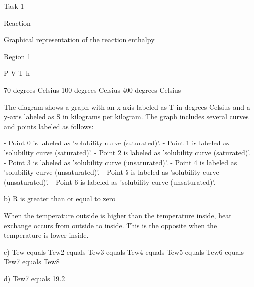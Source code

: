 Task 1

Reaction

Graphical representation of the reaction enthalpy

Region 1

P V T h

70 degrees Celsius 100 degrees Celsius 400 degrees Celsius

The diagram shows a graph with an x-axis labeled as T in degrees Celsius and a y-axis labeled as S in kilograms per kilogram. The graph includes several curves and points labeled as follows:

- Point 0 is labeled as 'solubility curve (saturated)'.
- Point 1 is labeled as 'solubility curve (saturated)'.
- Point 2 is labeled as 'solubility curve (saturated)'.
- Point 3 is labeled as 'solubility curve (unsaturated)'.
- Point 4 is labeled as 'solubility curve (unsaturated)'.
- Point 5 is labeled as 'solubility curve (unsaturated)'.
- Point 6 is labeled as 'solubility curve (unsaturated)'.

b) R is greater than or equal to zero

When the temperature outside is higher than the temperature inside, heat exchange occurs from outside to inside. This is the opposite when the temperature is lower inside.

c) Tew equals Tew2 equals Tew3 equals Tew4 equals Tew5 equals Tew6 equals Tew7 equals Tew8

d) Tew7 equals 19.2